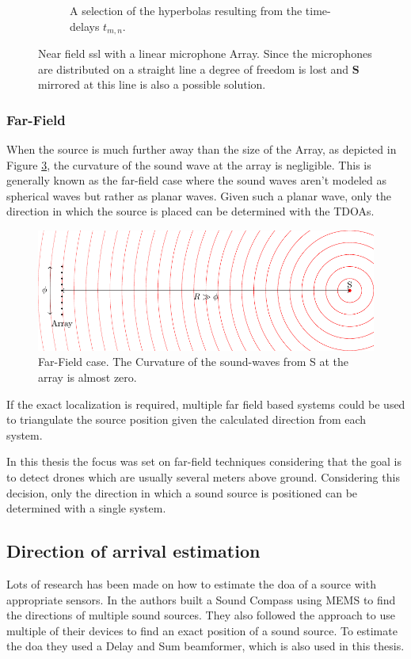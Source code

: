 \begin{figure}[ht]
\begin{subfigure}[b]{0.45\textwidth}
		\caption{A selection of the hyperbolas resulting from the time-delays $t_{m,n}$.}
		\label{ssl:fig:hyperbola}
	\end{subfigure}
	\caption{Near field \acrshort{ssl} with a linear microphone Array.
		Since the microphones are distributed on a straight line a degree of freedom is lost and
		$\bm{S}$ mirrored at this line is also a possible solution.}
	\label{fig:three graphs}
\end{figure}

\subsubsection{Far-Field}
When the source is much further away than the size of the Array, as depicted
in Figure \ref{ssl:fig:far field}, the curvature of the sound wave at the array is negligible.
This is generally known as the far-field case where the sound waves aren't
modeled as spherical waves but rather as planar waves.
Given such a planar wave, only the direction in which the source is placed can be determined with the TDOAs.

\begin{figure}[h]
	\centering
	\includegraphics[]{FarField.pdf}
	\caption{Far-Field case. The Curvature of the sound-waves from S at the array
		is almost zero.}
	\label{ssl:fig:far field}
\end{figure}

If the exact localization is required, multiple far field based systems could be
used to triangulate the source position given the calculated direction from each system.

In this thesis the focus was set on far-field techniques considering that the
goal is to detect drones which are usually several meters above ground.
Considering this decision, only the direction in which a sound source is positioned
can be determined with a single system.
\newpage
\subsection{Direction of arrival estimation}
Lots of research has been made on how to estimate the \acrfull*{doa} of a source
with appropriate sensors.
In \cite{s140201918} the authors built a Sound Compass
using MEMS to find the directions of multiple sound sources.
They also followed the approach to use multiple of their devices to
find an exact position of a sound source.
To estimate the \acrshort*{doa} they used a Delay and Sum beamformer,
which is also used in this thesis.

